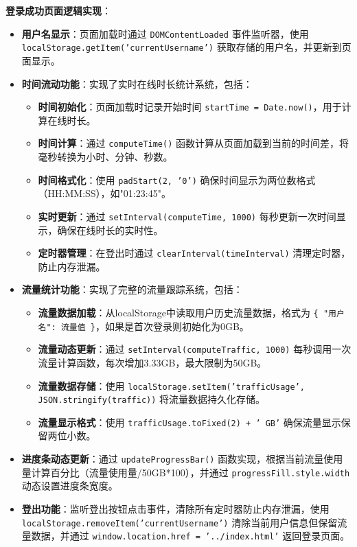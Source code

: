 \documentclass[UTF8]{ctexart}
\begin{document}
\textbf{登录成功页面逻辑实现}：
\begin{itemize}
    \item \textbf{用户名显示}：页面加载时通过 \texttt{DOMContentLoaded} 事件监听器，使用 \texttt{localStorage.getItem('currentUsername')} 获取存储的用户名，并更新到页面显示。
    
    \item \textbf{时间流动功能}：实现了实时在线时长统计系统，包括：
    \begin{itemize}
        \item \textbf{时间初始化}：页面加载时记录开始时间 \texttt{startTime = Date.now()}，用于计算在线时长。
        \item \textbf{时间计算}：通过 \texttt{computeTime()} 函数计算从页面加载到当前的时间差，将毫秒转换为小时、分钟、秒数。
        \item \textbf{时间格式化}：使用 \texttt{padStart(2, '0')} 确保时间显示为两位数格式（HH:MM:SS），如"01:23:45"。
        \item \textbf{实时更新}：通过 \texttt{setInterval(computeTime, 1000)} 每秒更新一次时间显示，确保在线时长的实时性。
        \item \textbf{定时器管理}：在登出时通过 \texttt{clearInterval(timeInterval)} 清理定时器，防止内存泄漏。
    \end{itemize}
    
    \item \textbf{流量统计功能}：实现了完整的流量跟踪系统，包括：
    \begin{itemize}
        \item \textbf{流量数据加载}：从localStorage中读取用户历史流量数据，格式为 \texttt{\{ "用户名": 流量值 \}}，如果是首次登录则初始化为0GB。
        \item \textbf{流量动态更新}：通过 \texttt{setInterval(computeTraffic, 1000)} 每秒调用一次流量计算函数，每次增加3.33GB，最大限制为50GB。
        \item \textbf{流量数据存储}：使用 \texttt{localStorage.setItem('trafficUsage', JSON.stringify(traffic))} 将流量数据持久化存储。
        \item \textbf{流量显示格式}：使用 \texttt{trafficUsage.toFixed(2) + ' GB'} 确保流量显示保留两位小数。
    \end{itemize}
    
    \item \textbf{进度条动态更新}：通过 \texttt{updateProgressBar()} 函数实现，根据当前流量使用量计算百分比（流量使用量/50GB*100），并通过 \texttt{progressFill.style.width} 动态设置进度条宽度。
    
    \item \textbf{登出功能}：监听登出按钮点击事件，清除所有定时器防止内存泄漏，使用 \texttt{localStorage.removeItem('currentUsername')} 清除当前用户信息但保留流量数据，并通过 \texttt{window.location.href = '../index.html'} 返回登录页面。
\end{itemize}
\end{document}
